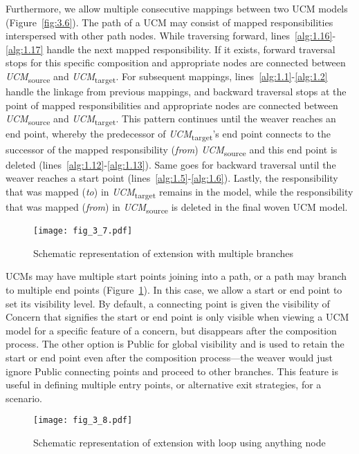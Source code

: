 Furthermore, we allow multiple consecutive mappings between two UCM models (Figure~\ref{fig:3.6}). The path of a UCM may consist of mapped responsibilities interspersed with other path nodes. While traversing forward, lines~\ref{alg:1.16}-\ref{alg:1.17} handle the next mapped responsibility. If it exists, forward traversal stops for this specific composition and appropriate nodes are connected between \emph{UCM}\textsubscript{source} and \emph{UCM}\textsubscript{target}. For subsequent mappings, lines~\ref{alg:1.1}-\ref{alg:1.2} handle the linkage from previous mappings, and backward traversal stops at the point of mapped responsibilities and appropriate nodes are connected between \emph{UCM}\textsubscript{source} and \emph{UCM}\textsubscript{target}. This pattern continues until the weaver reaches an end point, whereby the predecessor of \emph{UCM}\textsubscript{target}'s end point connects to the successor of the mapped responsibility (\emph{from}) \emph{UCM}\textsubscript{source} and this end point is deleted (lines~\ref{alg:1.12}-\ref{alg:1.13}). Same goes for backward traversal until the weaver reaches a start point (lines~\ref{alg:1.5}-\ref{alg:1.6}). Lastly, the responsibility that was mapped (\emph{to}) in \emph{UCM}\textsubscript{target} remains in the model, while the responsibility that was mapped (\emph{from}) in \emph{UCM}\textsubscript{source} is deleted in the final woven UCM model.

\begin{figure}
	\centering
	\texttt{[image: fig\_3\_7.pdf]}
	\caption{Schematic representation of extension with multiple branches}
	\label{fig:3.7}
\end{figure}

UCMs may have multiple start points joining into a path, or a path may branch to multiple end points (Figure~\ref{fig:3.7}). In this case, we allow a start or end point to set its visibility level. By default, a connecting point is given the visibility of {\cls Concern} that signifies the start or end point is only visible when viewing a UCM model for a specific feature of a concern, but disappears after the composition process. The other option is {\cls Public} for global visibility and is used to retain the start or end point even after the composition process---the weaver would just ignore {\cls Public} connecting points and proceed to other branches. This feature is useful in defining multiple entry points, or alternative exit strategies, for a scenario.

\begin{figure}
	\centering
	\texttt{[image: fig\_3\_8.pdf]}
	\caption{Schematic representation of extension with loop using anything node}
	\label{fig:3.8}
\end{figure}

